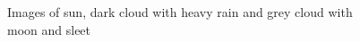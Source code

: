 \begin{figure}[!ht]
\centering

\hspace{1cm}

\hspace{1cm}


\caption{Images of sun, dark cloud with heavy rain and grey cloud with moon and sleet}
\label{fig:meteomind_svgs}
\end{figure}